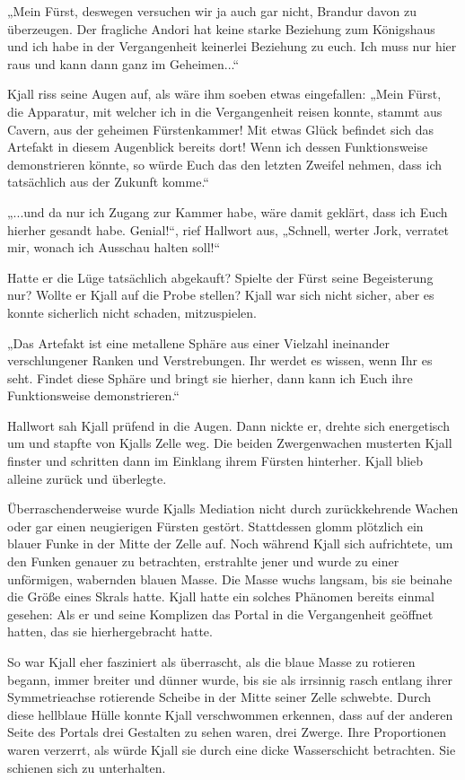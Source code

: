 \documentclass[10pt, a4paper, oneside]{book}
\begin{document}
„Mein Fürst, deswegen versuchen wir ja auch gar nicht, Brandur davon zu überzeugen. Der fragliche Andori hat keine starke Beziehung zum Königshaus und ich habe in der Vergangenheit keinerlei Beziehung zu euch. Ich muss nur hier raus und kann dann ganz im Geheimen...“

Kjall riss seine Augen auf, als wäre ihm soeben etwas eingefallen: „Mein Fürst, die Apparatur, mit welcher ich in die Vergangenheit reisen konnte, stammt aus Cavern, aus der geheimen Fürstenkammer! Mit etwas Glück befindet sich das Artefakt in diesem Augenblick bereits dort! Wenn ich dessen Funktionsweise demonstrieren könnte, so würde Euch das den letzten Zweifel nehmen, dass ich tatsächlich aus der Zukunft komme.“

„...und da nur ich Zugang zur Kammer habe, wäre damit geklärt, dass ich Euch hierher gesandt habe. Genial!“, rief Hallwort aus, „Schnell, werter Jork, verratet mir, wonach ich Ausschau halten soll!“

Hatte er die Lüge tatsächlich abgekauft? Spielte der Fürst seine Begeisterung nur? Wollte er Kjall auf die Probe stellen? Kjall war sich nicht sicher, aber es konnte sicherlich nicht schaden, mitzuspielen.

„Das Artefakt ist eine metallene Sphäre aus einer Vielzahl ineinander verschlungener Ranken und Verstrebungen. Ihr werdet es wissen, wenn Ihr es seht. Findet diese Sphäre und bringt sie hierher, dann kann ich Euch ihre Funktionsweise demonstrieren.“

Hallwort sah Kjall prüfend in die Augen. Dann nickte er, drehte sich energetisch um und stapfte von Kjalls Zelle weg. Die beiden Zwergenwachen musterten Kjall finster und schritten dann im Einklang ihrem Fürsten hinterher. Kjall blieb alleine zurück und überlegte.\bigskip



Überraschenderweise wurde Kjalls Mediation nicht durch zurückkehrende Wachen oder gar einen neugierigen Fürsten gestört. Stattdessen glomm plötzlich ein blauer Funke in der Mitte der Zelle auf. Noch während Kjall sich aufrichtete, um den Funken genauer zu betrachten, erstrahlte jener und wurde zu einer unförmigen, wabernden blauen Masse. Die Masse wuchs langsam, bis sie beinahe die Größe eines Skrals hatte. Kjall hatte ein solches Phänomen bereits einmal gesehen: Als er und seine Komplizen das Portal in die Vergangenheit geöffnet hatten, das sie hierhergebracht hatte.

So war Kjall eher fasziniert als überrascht, als die blaue Masse zu rotieren begann, immer breiter und dünner wurde, bis sie als irrsinnig rasch entlang ihrer Symmetrieachse rotierende Scheibe in der Mitte seiner Zelle schwebte. Durch diese hellblaue Hülle konnte Kjall verschwommen erkennen, dass auf der anderen Seite des Portals drei Gestalten zu sehen waren, drei Zwerge. Ihre Proportionen waren verzerrt, als würde Kjall sie durch eine dicke Wasserschicht betrachten. Sie schienen sich zu unterhalten.
\end{document}
